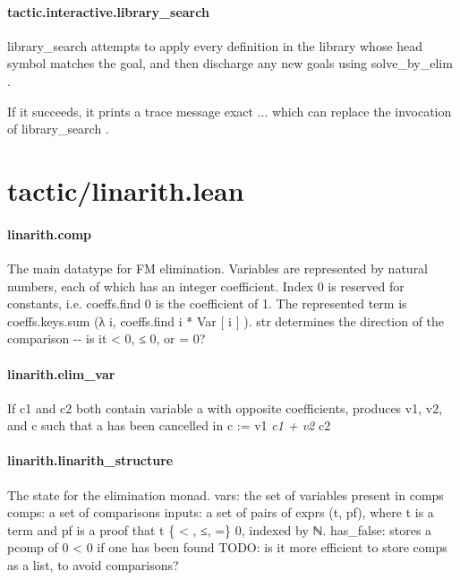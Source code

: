 \documentclass{article}
\begin{document}
\paragraph{tactic.interactive.library\_search}
\par
\colorbox[RGB]{253,246,227}{{{{\color[RGB]{101, 123, 131} library\_search }}}} attempts to apply every definition in the library whose head symbol
matches the goal, and then discharge any new goals using 
\colorbox[RGB]{253,246,227}{{{{\color[RGB]{101, 123, 131} solve\_by\_elim }}}}.
\par
If it succeeds, it prints a trace message 
\colorbox[RGB]{253,246,227}{{{{\color[RGB]{101, 123, 131} exact ... }}}} which can replace the invocation
of 
\colorbox[RGB]{253,246,227}{{{{\color[RGB]{101, 123, 131} library\_search }}}}.
\section{tactic/linarith.lean}\paragraph{linarith.comp}
\par
The main datatype for FM elimination.
Variables are represented by natural numbers, each of which has an integer coefficient.
Index 0 is reserved for constants, i.e. 
\colorbox[RGB]{253,246,227}{{{{\color[RGB]{101, 123, 131} coeffs.find  }}}{{{\color[RGB]{108, 113, 196} 0 }}}} is the coefficient of 1.
The represented term is coeffs.keys.sum (λ i, coeffs.find i * Var
{[}
i
{]}
).
str determines the direction of the comparison -{}- is it 
<
 0, ≤ 0, or = 0?
\paragraph{linarith.elim\_var}
\par
If c1 and c2 both contain variable a with opposite coefficients,
produces v1, v2, and c such that a has been cancelled in c := v1
\emph{c1 + v2
}c2
\paragraph{linarith.linarith\_structure}
\par
The state for the elimination monad.
vars: the set of variables present in comps
comps: a set of comparisons
inputs: a set of pairs of exprs (t, pf), where t is a term and pf is a proof that t \{
<
, ≤, =\} 0,
indexed by ℕ.
has\_false: stores a pcomp of 0 
<
 0 if one has been found
TODO: is it more efficient to store comps as a list, to avoid comparisons?
\end{document}
